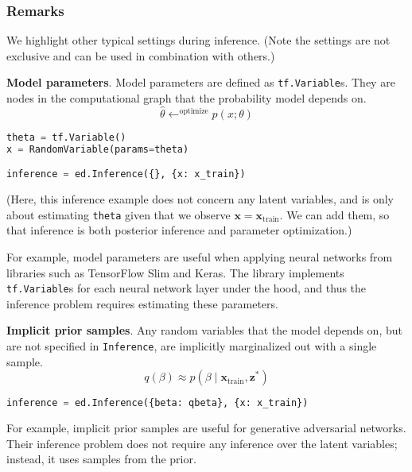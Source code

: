 \subsubsection{Remarks}

We highlight other typical settings during inference. (Note the settings are not exclusive and can be used in combination with others.)

\textbf{Model parameters}.
Model parameters are defined as \texttt{tf.Variable}s. They are
nodes in the computational graph that the probability model
depends on.
\begin{equation*}
\hat{\theta} \leftarrow^{\text{optimize}}
p(x; \theta)
\end{equation*}

\begin{lstlisting}[language=Python]
theta = tf.Variable()
x = RandomVariable(params=theta)

inference = ed.Inference({}, {x: x_train})
\end{lstlisting}
(Here, this inference example does not concern any latent variables, and is only about estimating \texttt{theta} given that we observe $\mathbf{x} = \mathbf{x}_{\text{train}}$. We can add them, so that inference is both posterior inference and parameter optimization.)

For example, model parameters are useful when applying neural networks
from libraries such as TensorFlow Slim and Keras. The library
implements \texttt{tf.Variable}s  for each neural network layer under
the hood, and thus the inference problem requires estimating these
parameters.

\textbf{Implicit prior samples}.
Any random variables that the model depends on, but are not specified
in \texttt{Inference}, are implicitly marginalized out with a single
sample.
\begin{equation*}
q(\beta)\approx
p(\beta\mid\mathbf{x}_{\text{train}}, \mathbf{z}^*)
\end{equation*}

\begin{lstlisting}[language=Python]
inference = ed.Inference({beta: qbeta}, {x: x_train})
\end{lstlisting}

For example, implicit prior samples are useful for generative adversarial
networks. Their inference problem does not require any inference over
the latent variables; instead, it uses samples from the prior.
